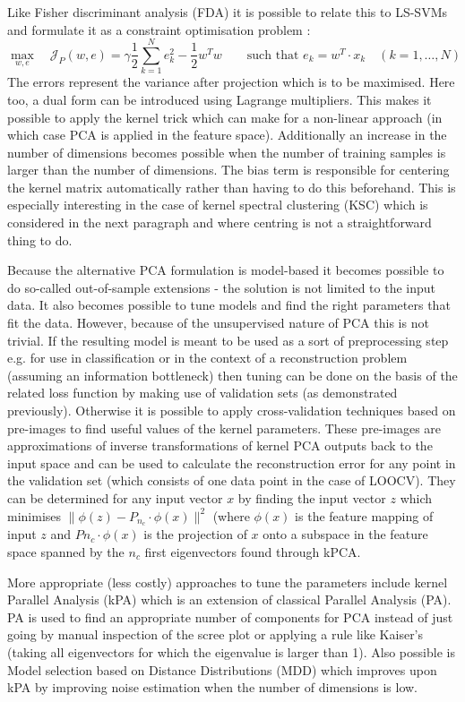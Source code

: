 \par Like Fisher discriminant analysis (FDA) it is possible to relate this to LS-SVMs and formulate it as a constraint optimisation problem :
$$\max_{w,e}\quad\mathcal{J}_P(w,e)=\gamma\frac{1}{2}\sum_{k=1}^Ne_k^2-\frac{1}{2}w^Tw\qquad\text{such that $e_k=w^T\cdot x_k\quad(k=1,\dots, N)$}$$
The errors represent the variance after projection which is to be maximised. Here too, a dual form can be introduced using Lagrange multipliers. This makes it possible to apply the kernel trick which can make for a non-linear approach (in which case PCA is applied in the feature space). Additionally an increase in the number of dimensions becomes possible when the number of training samples is larger than the number of dimensions. The bias term is responsible for centering the kernel matrix automatically rather than having to do this beforehand. This is especially interesting in the case of kernel spectral clustering (KSC) which is considered in the next paragraph and where centring is not a straightforward thing to do.

\par Because the alternative PCA formulation is model-based it becomes possible to do so-called out-of-sample extensions - the solution is not limited to the input data. It also becomes possible to tune models and find the right parameters that fit the data. However, because of the unsupervised nature of PCA this is not trivial. If the resulting model is meant to be used as a sort of preprocessing step e.g. for use in classification or in the context of a reconstruction problem (assuming an information bottleneck) then tuning can be done on the basis of the related loss function by making use of validation sets (as demonstrated previously). Otherwise it is possible to apply cross-validation techniques based on pre-images to find useful values of the kernel parameters. These pre-images are approximations of inverse transformations of kernel PCA outputs back to the input space and can be used to calculate the reconstruction error for any point in the validation set (which consists of one data point in the case of LOOCV). They can be determined for any input vector $x$ by finding the input vector $z$ which minimises $\|\phi(z)-P_{n_c}\cdot \phi(x)\|^2$ (where $\phi(x)$ is the feature mapping of input $z$ and $P{n_c}\cdot\phi(x)$ is the projection of $x$ onto a subspace in the feature space spanned by the $n_c$ first eigenvectors found through kPCA.

\par More appropriate (less costly) approaches to tune the parameters include kernel Parallel Analysis (kPA) which is an extension of classical Parallel Analysis (PA). PA is used to find an appropriate number of components for PCA instead of just going by manual inspection of the scree plot or applying a rule like Kaiser's (taking all eigenvectors for which the eigenvalue is larger than 1). Also possible is Model selection based on Distance Distributions (MDD) which improves upon kPA by improving noise estimation when the number of dimensions is low.

